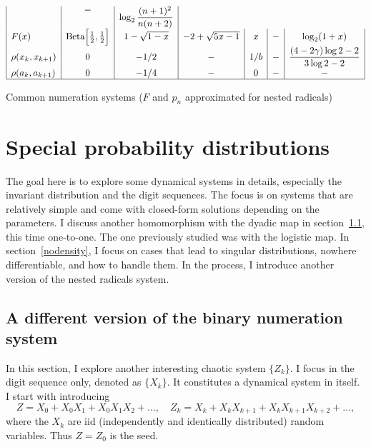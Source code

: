 \documentclass[oneside,10pt]{book}
\begin{document}
\begin{table}[H]
\[\begin{array}{|l|c|c|c|c|c|c|}
  &  \shortstack{$-$ \\ \textcolor{white}{xx}}
  & \log_2\mathlarger{\frac{(n+1)^2}{n(n+2)}}\\[4pt]
F(x) & \text{Beta}\Big[\frac{1}{2},\frac{1}{2}\Big]
 & 1-\sqrt{1-x}
 &  -2 + \sqrt{5x-1}
 & x & - & \log_2(1+x)\\[4pt]
 \rho(x_k, x_{k+1}) & 0 & -1/2 & - & 1/b & -
 &  \mathlarger{ \frac{(4-2\gamma)\log 2 - 2}{3\log 2 - 2} }\\
\rho(a_k,a_{k+1}) & 0 & -1/4 & - & 0 & - & - \\
\hline
\end{array}
\]
\caption{\label{ttyttuchi} Common numeration systems ($F$ and  $p_n$ approximated for nested radicals)}
\end{table}





\section{Special probability distributions}\label{gorexcres}

The goal here is to explore some dynamical systems in details, especially the invariant distribution and the digit sequences.
 The focus is on systems that are relatively simple and come with closed-form solutions depending on the parameters.
 I discuss another homomorphism with the dyadic map in section~\ref{scrotew}, this time one-to-one. The one previously studied was with the logistic map. In section~\ref{nodensity}, I focus on cases that lead to singular distributions, nowhere differentiable, and how to handle them.
 In the process, I introduce another version of the nested radicals system.


\subsection{A different version of the binary numeration system}\label{scrotew}

In this section, I explore another interesting chaotic system $\{Z_k\}$.
I focus in the digit sequence only,  denoted as $\{X_k\}$. It constitutes a dynamical system in itself.
I start with introducing
\begin{equation}
Z = X_0 + X_0 X_1 +X_0 X_1 X_2 + \dots, \quad Z_k = X_k + X_k X_{k+1} +X_k X_{k+1} X_{k+2} + \dots,\label{digere}
\end{equation}
where the $X_k$ are iid (independently and identically distributed) random variables. Thus $Z=Z_0$ is the \textcolor{index}{seed}.
\end{document}
